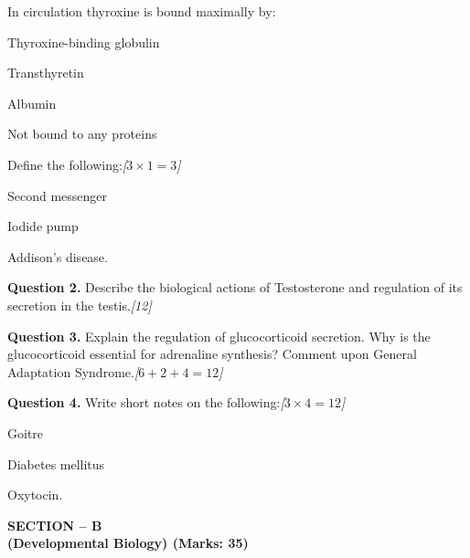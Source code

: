 \documentclass[11pt,a4paper]{article}
\newcommand{\pts}[1]{\hfill   \textit{[#1]}}
\begin{document}
\begin{parts}
\begin{parts}
    \item In circulation thyroxine is bound maximally by:
    
\begin{parts}
      \item Thyroxine-binding globulin
      \item Transthyretin
      \item Albumin
      \item Not bound to any proteins
    \end{parts}
  \end{parts}

  \item Define the following:\pts{$3  \times 1 = 3$}
  
\begin{parts}
    \item Second messenger
    \item Iodide pump
    \item Addison's disease.
  \end{parts}
\end{parts}

\medskip


\noindent   \textbf{Question 2.} Describe the biological actions of Testosterone and regulation of its secretion in the testis.\pts{12}

\medskip


\noindent   \textbf{Question 3.} Explain the regulation of glucocorticoid secretion. Why is the glucocorticoid essential for adrenaline synthesis? Comment upon General Adaptation Syndrome.\pts{$6 + 2 + 4 = 12$}

\medskip


\noindent   \textbf{Question 4.} Write short notes on the following:\pts{$3  \times 4 = 12$}

\begin{parts}
  \item Goitre
  \item Diabetes mellitus
  \item Oxytocin.
\end{parts}

\pagebreak

\begin{center}
   \textbf{SECTION -- B} \\
   \textbf{(Developmental Biology) (Marks: 35)}
\end{center}

\smallskip
\end{document}
